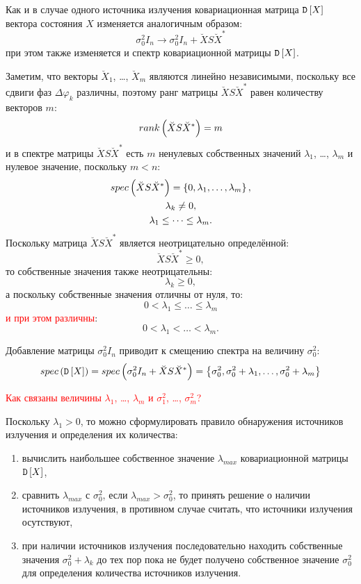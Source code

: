 Как и в случае одного источника излучения ковариационная матрица $\mathtt{D} \left [ X \right ]$ вектора состояния $X$ изменяется аналогичным образом:
\[
    \sigma_0^2 I_n \rightarrow \sigma_0^2 I_n + \breve{X} S \breve{X}^*
\]
при этом также изменяется и спектр ковариационной матрицы $\mathtt{D} \left [ X \right ]$.

Заметим, что векторы $\breve{X}_1$, \dots, $\breve{X}_m$ являются линейно независимыми, поскольку все сдвиги фаз $\Delta \varphi_k$ различны, поэтому ранг матрицы
$\breve{X} S \breve{X}^*$ равен количеству векторов $m$:
\[
    rank \left ( \breve{X} S \breve{X}^* \right ) = m
\]
и в спектре матрицы $\breve{X} S \breve{X}^*$ есть $m$ ненулевых собственных значений $\lambda_1$, \dots, $\lambda_m$ и нулевое значение, поскольку
$m < n$:
\begin{gather*}
    spec \left ( \breve{X} S \breve{X}^* \right ) = \left \{ 0, \lambda_1, \dots, \lambda_m \right \}, \\
    \lambda_k \neq 0, \\
    \lambda_1 \le \dots \le \lambda_m .
\end{gather*}
Поскольку матрица $\breve{X} S \breve{X}^*$ является неотрицательно определённой:
\[
    \breve{X} S \breve{X}^* \ge 0 ,
\]
то собственные значения также неотрицательны:
\[
    \lambda_k \ge 0,
\]
а поскольку собственные значения отличны от нуля, то:
\[
    0 < \lambda_1 \le \dots \le \lambda_m
\]
\textcolor{red}{и при этом различны}:
\[
    0 < \lambda_1 < \dots < \lambda_m .
\]

Добавление матрицы $\sigma_0^2 I_n$ приводит к смещению спектра на величину $\sigma_0^2$:
\[
    spec \left ( \mathtt{D} \left [ X \right ] \right )
    = spec \left ( \sigma_0^2 I_n + \breve{X} S \breve{X}^* \right )
    = \left \{ \sigma_0^2, \sigma_0^2 + \lambda_1, \dots, \sigma_0^2 + \lambda_m \right \}
\]

\textcolor{red}{Как связаны величины $\lambda_1$, \dots, $\lambda_m$ и $\sigma_1^2$, \dots, $\sigma_m^2$?}

Поскольку $\lambda_1 > 0$, то можно сформулировать правило обнаружения источников излучения и определения их количества:
\begin{enumerate}
    \item вычислить наибольшее собственное значение $\lambda_{max}$ ковариационной матрицы $\mathtt{D} \left [ X \right ]$,
    \item сравнить $\lambda_{max}$ с $\sigma_0^2$, если $\lambda_{max} > \sigma_0^2$, то принять решение о наличии источников излучения, в противном случае
    считать, что источники излучения осутствуют,
    \item при наличии источников излучения последовательно находить собственные значения $\sigma_0^2 + \lambda_k$ до тех пор пока не будет получено собственное
    значение $\sigma_0^2$ для определения количества источников излучения.
\end{enumerate}


